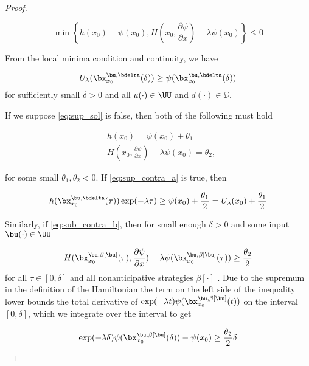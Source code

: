 \begin{for_journal}
\begin{proof}
\begin{definition}
\begin{equation}\label{eq:sup_sol}
    \min\left\{h(x_0)-\psi(x_0), H(x_0,\frac{\partial \psi}{\partial x}) - \lambda \psi(x_0)\right\} \leq 0
\end{equation} 
\end{definition}

From the local minima condition and continuity, we have

\begin{equation*}
U_{\lambda}(\bx_{x_0}^{\bu, \bdelta}(\delta)) \geq \psi(\bx_{x_0}^{\bu, \bdelta}(\delta))
\end{equation*}%
\noindent for sufficiently small $\delta>0$ and all $u(\cdot) \in \UU$ and $d(\cdot) \in \DD$.

If we suppose \eqref{eq:sup_sol} is false, then both of the following must hold 

\begin{subequations}
\begin{align}
&h(x_0) = \psi(x_0) + \theta_1 \label{eq:sup_contra_a}\\
&H(x_0,\frac{\partial \psi}{\partial x}) - \lambda \psi(x_0) = \theta_2 \label{eq:sup_contra_b},
\end{align} 
\end{subequations}

for some small $\theta_1, \theta_2 < 0$. If \eqref{eq:sup_contra_a} is true, then 

\begin{equation}
h(\bx_{x_0}^{\bu, \bdelta}(\tau))\exp(-\lambda \tau) \geq \psi(x_0) + \frac{\theta_1}{2} = U_{\lambda}(x_0) + \frac{\theta_1}{2}
\end{equation}

Similarly, if \eqref{eq:sub_contra_b}, then for small enough $\delta>0$ and  some input $\bu(\cdot) \in \UU$ 

\begin{equation}
H(\bx_{x_0}^{\bu,\beta[\bu]}(\tau), \frac{\partial \psi}{\partial x}) - \lambda \psi(\bx_{x_0}^{\bu,\beta[\bu]}(\tau)) \geq \frac{\theta_2}{2}
\end{equation}%
\noindent for all $\tau \in [0,\delta]$ and all nonanticipative strategies $\beta[\cdot]$ . Due to the supremum in the definition of the Hamiltonian the term on the left side of the inequality lower bounds the total derivative of $\exp(-\lambda t)\psi(\bx_{x_0}^{\bu,\beta[\bu]}(t))$ on the interval $[0,\delta]$,  which we integrate over the interval to get

\begin{equation}
\exp(-\lambda \delta)\psi(\bx_{x_0}^{\bu,\beta[\bu]}(\delta))-\psi(x_0) \geq \frac{\theta_2}{2} \delta
\end{equation}


\end{proof}
\end{for_journal}
